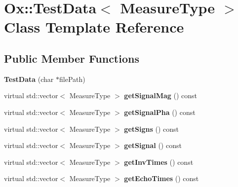 \hypertarget{class_ox_1_1_test_data}{}\section{Ox\+:\+:Test\+Data$<$ Measure\+Type $>$ Class Template Reference}
\label{class_ox_1_1_test_data}
\subsection*{Public Member Functions}
\begin{DoxyCompactItemize}
\item 
{\bfseries Test\+Data} (char $\ast$file\+Path)\hypertarget{class_ox_1_1_test_data_add19d13b8ec2404fc5d6ebf4ee79a231}{}\label{class_ox_1_1_test_data_add19d13b8ec2404fc5d6ebf4ee79a231}

\item 
virtual std\+::vector$<$ Measure\+Type $>$ {\bfseries get\+Signal\+Mag} () const \hypertarget{class_ox_1_1_test_data_a4e75699c035937ff96fa131505870208}{}\label{class_ox_1_1_test_data_a4e75699c035937ff96fa131505870208}

\item 
virtual std\+::vector$<$ Measure\+Type $>$ {\bfseries get\+Signal\+Pha} () const \hypertarget{class_ox_1_1_test_data_a287f28ddb03f9acc694528441b57c375}{}\label{class_ox_1_1_test_data_a287f28ddb03f9acc694528441b57c375}

\item 
virtual std\+::vector$<$ Measure\+Type $>$ {\bfseries get\+Signs} () const \hypertarget{class_ox_1_1_test_data_a414b631b105104920740e51dcc4a3948}{}\label{class_ox_1_1_test_data_a414b631b105104920740e51dcc4a3948}

\item 
virtual std\+::vector$<$ Measure\+Type $>$ {\bfseries get\+Signal} () const \hypertarget{class_ox_1_1_test_data_a0dafaca55a2c3d57ff2106b518b3fada}{}\label{class_ox_1_1_test_data_a0dafaca55a2c3d57ff2106b518b3fada}

\item 
virtual std\+::vector$<$ Measure\+Type $>$ {\bfseries get\+Inv\+Times} () const \hypertarget{class_ox_1_1_test_data_acec1269baa03bfa45845f94f3bc15abe}{}\label{class_ox_1_1_test_data_acec1269baa03bfa45845f94f3bc15abe}

\item 
virtual std\+::vector$<$ Measure\+Type $>$ {\bfseries get\+Echo\+Times} () const \hypertarget{class_ox_1_1_test_data_a9fbce0afea939f1f0533bb2b325242a6}{}\label{class_ox_1_1_test_data_a9fbce0afea939f1f0533bb2b325242a6}


\end{DoxyCompactItemize}
